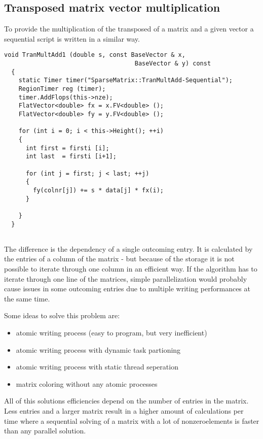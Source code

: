 \documentclass[a4paper,11pt]{scrartcl}
\begin{document}
\subsection{Transposed matrix vector multiplication}

To provide the multiplication of the transposed of a matrix and a given vector
 a sequential script is written in a similar way.

\begin{lstlisting}
void TranMultAdd1 (double s, const BaseVector & x,
                                    BaseVector & y) const
  {
    static Timer timer("SparseMatrix::TranMultAdd-Sequential");
    RegionTimer reg (timer);
    timer.AddFlops(this->nze);
    FlatVector<double> fx = x.FV<double> ();
    FlatVector<double> fy = y.FV<double> ();

    for (int i = 0; i < this->Height(); ++i)
    {
      int first = firsti [i];
      int last  = firsti [i+1];

      for (int j = first; j < last; ++j)
      {
        fy(colnr[j]) += s * data[j] * fx(i);
      }

    }
  }


\end{lstlisting}

The difference is the dependency of a single outcoming entry. It is calculated
 by the entries of a column of the matrix - but because of the storage it is not
possible to iterate through one column in an efficient way. If the algorithm
has to iterate through one line of the matrices, simple parallelization would
probably cause issues in some outcoming entries due to multiple writing
performances at the same time.

Some ideas to solve this problem are:

\begin{itemize}

\item atomic writing process (easy to program, but very inefficient)
\item atomic writing process with dynamic task partioning
\item atomic writing process with static thread seperation
\item matrix coloring without any atomic processes

\end{itemize}

All of this solutions efficiencies depend on the number of entries in the matrix.
Less entries and a larger matrix result in a higher amount of calculations per
 time where a sequential solving of a matrix with a lot of nonzeroelements is
 faster than any parallel solution.
\end{document}
